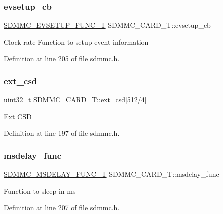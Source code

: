 \subsubsection{\texorpdfstring{evsetup\+\_\+cb}{evsetup\_cb}}
{\footnotesize\ttfamily \hyperlink{group___c_h_i_p___s_d_m_m_c___definitions_gad8f6b6485a8de8a55a8cdee88788a64c}{S\+D\+M\+M\+C\+\_\+\+E\+V\+S\+E\+T\+U\+P\+\_\+\+F\+U\+N\+C\+\_\+T} S\+D\+M\+M\+C\+\_\+\+C\+A\+R\+D\+\_\+\+T\+::evsetup\+\_\+cb}

Clock rate Function to setup event information 

Definition at line 205 of file sdmmc.\+h.

\mbox{\label{struct_s_d_m_m_c___c_a_r_d___t_abce2d2420c62821bc583f3a89744ddf4}} 
\subsubsection{\texorpdfstring{ext\+\_\+csd}{ext\_csd}}
{\footnotesize\ttfamily uint32\+\_\+t S\+D\+M\+M\+C\+\_\+\+C\+A\+R\+D\+\_\+\+T\+::ext\+\_\+csd\mbox{[}512/4\mbox{]}}

Ext C\+SD 

Definition at line 197 of file sdmmc.\+h.

\mbox{\label{struct_s_d_m_m_c___c_a_r_d___t_a10bb6418c66c7794c18a890b031f1fa2}} 
\subsubsection{\texorpdfstring{msdelay\+\_\+func}{msdelay\_func}}
{\footnotesize\ttfamily \hyperlink{group___c_h_i_p___s_d_m_m_c___definitions_ga910711513843f370e9b251ec60b245e7}{S\+D\+M\+M\+C\+\_\+\+M\+S\+D\+E\+L\+A\+Y\+\_\+\+F\+U\+N\+C\+\_\+T} S\+D\+M\+M\+C\+\_\+\+C\+A\+R\+D\+\_\+\+T\+::msdelay\+\_\+func}

Function to sleep in ms 

Definition at line 207 of file sdmmc.\+h.

